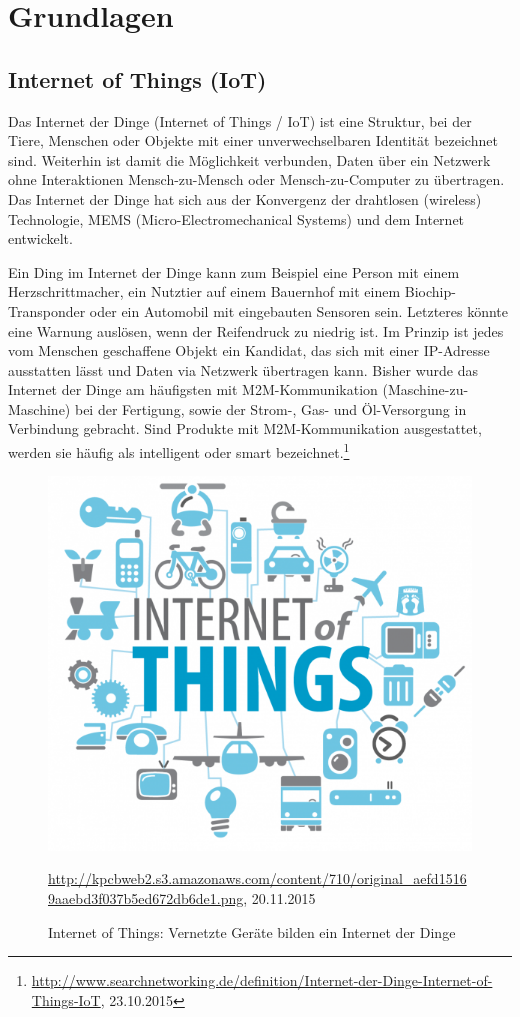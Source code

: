\chapter{Grundlagen}
\section{Internet of Things (IoT)}
Das Internet der Dinge (Internet of Things / IoT) ist eine Struktur, bei der Tiere, Menschen oder Objekte mit einer unverwechselbaren  Identität bezeichnet sind. Weiterhin ist damit die Möglichkeit verbunden, Daten über ein Netzwerk ohne Interaktionen Mensch-zu-Mensch oder Mensch-zu-Computer zu übertragen. Das Internet der Dinge hat sich aus der Konvergenz der drahtlosen (wireless) Technologie, MEMS (Micro-Electromechanical Systems) und dem Internet entwickelt.

Ein Ding im Internet der Dinge kann zum Beispiel eine Person mit einem Herzschrittmacher, ein Nutztier auf einem Bauernhof mit einem Biochip-Transponder oder ein Automobil mit eingebauten Sensoren sein. Letzteres könnte eine Warnung auslösen, wenn der Reifendruck zu niedrig ist. Im Prinzip ist jedes vom Menschen geschaffene Objekt ein Kandidat, das sich mit einer IP-Adresse ausstatten lässt und Daten via Netzwerk übertragen kann. Bisher wurde das Internet der Dinge am häufigsten mit M2M-Kommunikation (Maschine-zu-Maschine) bei der Fertigung, sowie der Strom-, Gas- und Öl-Versorgung in Verbindung gebracht. Sind Produkte mit M2M-Kommunikation ausgestattet, werden sie häufig als intelligent oder smart bezeichnet.\footnote{\url{http://www.searchnetworking.de/definition/Internet-der-Dinge-Internet-of-Things-IoT}, 23.10.2015}
\begin{figure}[h]
  \centering
  \includegraphics[scale=0.5]{98_Bilder/02_Grundlagen/iot}
  \caption[Symbolbild Internet of Things]{Internet of Things: Vernetzte Geräte bilden ein Internet der Dinge}
  \footnotesize \url{http://kpcbweb2.s3.amazonaws.com/content/710/original_aefd15169aaebd3f037b5ed672db6de1.png}, 20.11.2015
\end{figure}

